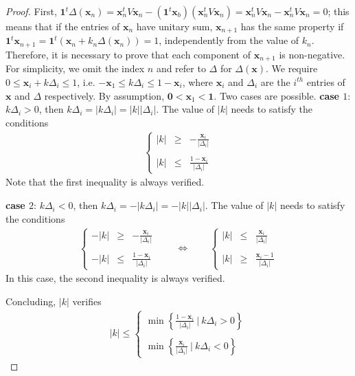 \documentclass[10pt,a4paper]{amsart}
\begin{document}
\begin{proof}
First,
$ \mathbf 1^t \Delta(\mathbf{x}_n)=\mathbf{x}_n^tV\mathbf{x}_n-(\mathbf 1^t \mathbf{x}_b)(\mathbf{x}_n^tV\mathbf{x}_n)=\mathbf{x}_n^tV\mathbf{x}_n-\mathbf{x}_n^tV\mathbf{x}_n=0$; this means that if the entries of $\mathbf{x}_n$ have unitary sum, $\mathbf{x}_{n+1}$ has the same property if $\mathbf 1^t \mathbf{x}_{n+1}=\mathbf 1^t(\mathbf{x}_n+k_n \Delta(\mathbf{x}_n))=1$, 
independently from the value of $k_n$. Therefore, it is necessary to prove that each component of $\mathbf{x}_{n+1}$ is non-negative. For simplicity, we omit the index $n$ and refer to $\Delta$ for $\Delta(\mathbf{x})$. We require 
$ 0 \le \mathbf{x}_i +k \Delta_i \le 1$, i.e. $ -\mathbf{x}_1 \le k \Delta_i \le 1-\mathbf{x}_i$, 
where $\mathbf{x}_i$ and $\Delta_i$ are the $i^{th}$ entries of $\mathbf{x}$ and $\Delta$ respectively. By assumption, $\mathbf{0} < \mathbf{x}_1 < \mathbf{1}$.
Two cases are possible.
\smallskip\noindent
\textbf{case $1$}: $k \Delta_i >0$, then $k \Delta_i =|k \Delta_i |= |k|| \Delta_i |$. The value of $|k|$ needs to satisfy the conditions 
\begin{eqnarray*}
\left\{\begin{array}{rcl} |k|&\ge& -\frac{\mathbf{x}_i}{ |\Delta_i| } \\ \\
|k| & \le & \frac{1-\mathbf{x}_i}{ |\Delta_i| }
\end{array}
\right. 
\end{eqnarray*}
Note that the first inequality is always verified.

\smallskip\noindent
\textbf{case $2$}: $k \Delta_i <0$, then $k \Delta_i =-|k \Delta_i |= -|k|| \Delta_i |$. The value of $|k|$ needs to satisfy the conditions 
\begin{eqnarray*}
\left\{\begin{array}{rcl} -|k|&\ge& -\frac{\mathbf{x}_i}{ |\Delta_i| } \\ \\
-|k| & \le & \frac{1-\mathbf{x}_i}{ |\Delta_i| }
\end{array}
\right. \qquad \Leftrightarrow \qquad  \left\{\begin{array}{rcl} |k|&\le& \frac{\mathbf{x}_i}{ |\Delta_i| } \\ \\
|k| & \ge & \frac{\mathbf{x}_i-1 }{ |\Delta_i| }
\end{array}
\right. 
\end{eqnarray*}
In this case, the second inequality is always verified.


\smallskip\noindent
Concluding, $|k|$ verifies 
\begin{eqnarray*}
|k| \le \left\{\begin{array}{l} \min \left \{ \frac{1-\mathbf{x}_i}{ |\Delta_i| }  \ | \ k\Delta_i >0  \right  \} \\ \\
 \min \left \{ \frac{\mathbf{x}_i}{ |\Delta_i| }  \ | \ k\Delta_i <0  \right  \}
\end{array}
\right.
\end{eqnarray*}
\end{proof}
\end{document}
